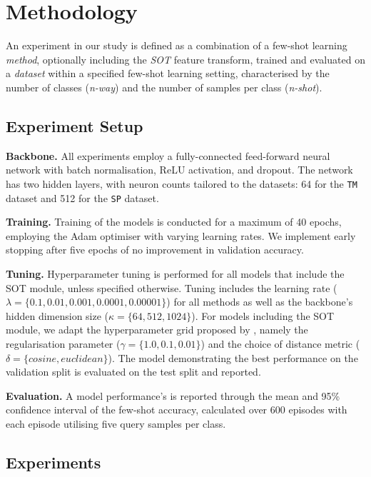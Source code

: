 \section{Methodology}

An experiment in our study is defined as a combination of a few-shot learning \textit{method}, optionally including the \textit{SOT} feature transform, trained and evaluated on a \textit{dataset} within 
a specified few-shot learning setting, characterised by the number of classes (\textit{n-way}) and the number of samples per class (\textit{n-shot}).

\subsection{Experiment Setup}

\textbf{Backbone.} All experiments employ a fully-connected feed-forward neural network with batch normalisation, ReLU activation, and dropout. 
The network has two hidden layers, with neuron counts tailored to the datasets: 64 for the \texttt{TM} dataset and 512 for the \texttt{SP} dataset.

\textbf{Training.} Training of the models is conducted for a maximum of 40 epochs, employing the Adam optimiser with varying learning rates. 
We implement early stopping after five epochs of no improvement in validation accuracy. 

\textbf{Tuning.} Hyperparameter tuning is performed for all models that include the SOT module, unless specified otherwise. Tuning includes the learning rate ($\lambda = \{0.1, 0.01, 0.001, 0.0001, 0.00001\}$) for all methods as well as the backbone's hidden dimension size ($\kappa = \{64, 512, 1024\}$). For models including the SOT module, we adapt the hyperparameter grid proposed by \citeauthor{sot}, namely the regularisation parameter ($\gamma = \{1.0, 0.1, 0.01\}$) and the choice of distance metric ($\delta = \{cosine, euclidean\}$). 
The model demonstrating the best performance on the validation split is evaluated on the test split and reported.

\textbf{Evaluation.} A model performance's is reported through the mean and 95\% confidence interval of the few-shot accuracy, calculated over 600 episodes with each episode utilising five query samples per class.

\subsection{Experiments}

